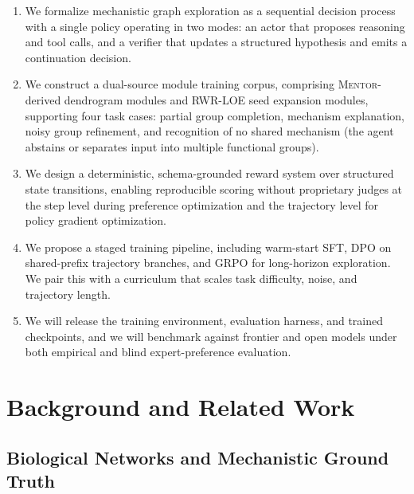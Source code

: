 \documentclass[thesis,letterpaper,12pt]{utthesis}
\begin{document}
\begin{enumerate}
    \item We formalize mechanistic graph exploration as a sequential decision process with a single policy operating in two modes: an actor that proposes reasoning and tool calls, and a verifier that updates a structured hypothesis and emits a continuation decision.

    \item We construct a dual-source module training corpus, comprising \textsc{Mentor}-derived dendrogram modules and RWR-LOE seed expansion modules, supporting four task cases: partial group completion, mechanism explanation, noisy group refinement, and recognition of no shared mechanism (the agent abstains or separates input into multiple functional groups).

    \item We design a deterministic, schema-grounded reward system over structured state transitions, enabling reproducible scoring without proprietary judges at the step level during preference optimization and the trajectory level for policy gradient optimization.
    
    \item We propose a staged training pipeline, including warm-start SFT, DPO on shared-prefix trajectory branches, and GRPO for long-horizon exploration. We pair this with a curriculum that scales task difficulty, noise, and trajectory length.

    \item We will release the training environment, evaluation harness, and trained checkpoints, and we will benchmark against frontier and open models under both empirical and blind expert-preference evaluation.
\end{enumerate}

\section{Background and Related Work}
\subsection{Biological Networks and Mechanistic Ground Truth}
\end{document}

